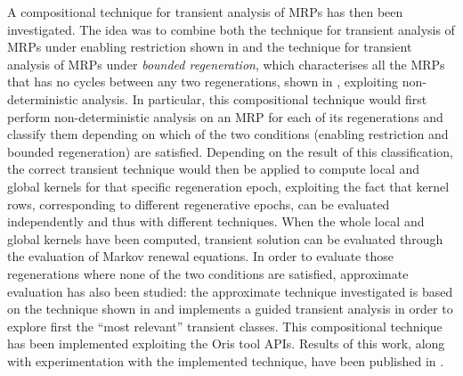   A compositional technique for transient analysis of \acp{MRP} has then been investigated. The idea was to combine both the technique for transient analysis of \acp{MRP} under enabling restriction shown in \cite{german1995transient} and the technique for transient analysis of \acp{MRP} under \textit{bounded regeneration}, which characterises all the \acp{MRP} that has no cycles between any two regenerations, shown in \cite{horvath2012transient}, exploiting non-deterministic analysis. In particular, this compositional technique would first perform non-deterministic analysis on an \ac{MRP} for each of its regenerations and classify them depending on which of the two conditions (enabling restriction and bounded regeneration) are satisfied. Depending on the result of this classification, the correct transient technique would then be applied to compute local and global kernels for that specific regeneration epoch, exploiting the fact that kernel rows, corresponding to different regenerative epochs, can be evaluated independently and thus with different techniques. When the whole local and global kernels have been computed, transient solution can be evaluated through the evaluation of Markov renewal equations. In order to evaluate those regenerations where none of the two conditions are satisfied, approximate evaluation has also been studied: the approximate technique investigated is based on the technique shown in \cite{horvath2012transient} and implements a guided transient analysis in order to explore first the ``most relevant'' transient classes. This compositional technique has been implemented exploiting the Oris tool \acp{API}. Results of this work, along with experimentation with the implemented technique, have been published in \cite{biagi2017exploiting}.
  
